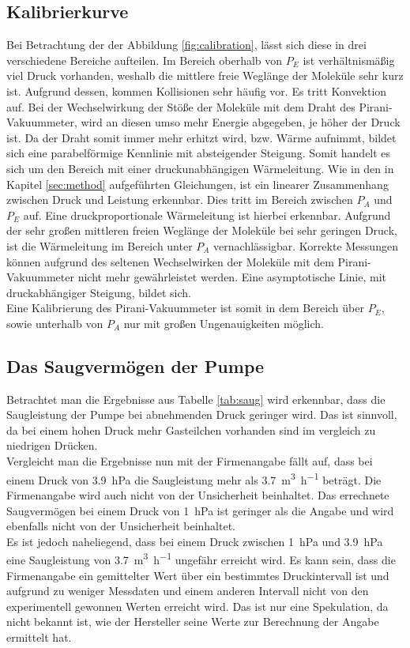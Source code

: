 \documentclass[a4paper,usenatbib]{aspdoc}
\begin{document}
        \subsection{Kalibrierkurve}
            Bei Betrachtung der der Abbildung \ref{fig:calibration}, lässt sich diese in drei verschiedene Bereiche aufteilen. Im Bereich oberhalb von $P_E$ ist verhältnismäßig viel Druck vorhanden, weshalb die mittlere freie Weglänge der Moleküle sehr kurz ist. Aufgrund dessen, kommen Kollisionen sehr häufig vor. Es tritt Konvektion auf. Bei der Wechselwirkung der Stöße der Moleküle mit dem Draht des Pirani-Vakuummeter, wird an diesen umso mehr Energie abgegeben, je höher der Druck ist. Da der Draht somit immer mehr erhitzt wird, bzw. Wärme aufnimmt, bildet sich eine parabelförmige Kennlinie mit absteigender Steigung. Somit handelt es sich um den Bereich mit einer druckunabhängigen Wärmeleitung.
            Wie in den in Kapitel \ref{sec:method} aufgeführten Gleichungen, ist ein linearer Zusammenhang zwischen Druck und Leistung erkennbar. Dies tritt im Bereich zwischen $P_A$ und $P_E$ auf. Eine druckproportionale Wärmeleitung ist hierbei erkennbar.
            Aufgrund der sehr großen mittleren freien Weglänge der Moleküle bei sehr geringen Druck, ist die Wärmeleitung im Bereich unter $P_A$ vernachlässigbar. Korrekte Messungen können aufgrund des seltenen Wechselwirken der Moleküle mit dem Pirani-Vakuummeter nicht mehr gewährleistet werden. Eine asymptotische Linie, mit druckabhängiger Steigung, bildet sich.
            \\
            Eine Kalibrierung des Pirani-Vakuummeter ist somit in dem Bereich über $P_E$, sowie unterhalb von $P_A$ nur mit großen Ungenauigkeiten möglich.
            
        \subsection{Das Saugvermögen der Pumpe}
            Betrachtet man die Ergebnisse aus Tabelle \ref{tab:saug} wird erkennbar, dass die Saugleistung der Pumpe bei abnehmenden Druck geringer wird. Das ist sinnvoll, da bei einem hohen Druck mehr Gasteilchen vorhanden sind im vergleich zu niedrigen Drücken.\\
            Vergleicht man die Ergebnisse nun mit der Firmenangabe fällt auf, dass bei einem Druck von \SI{3,9}{\hecto\pascal} die Saugleistung mehr als \SI[per-mode=fraction]{3,7}{\cubic\metre\per\hour} beträgt. Die Firmenangabe wird auch nicht von der Unsicherheit beinhaltet. Das errechnete Saugvermögen bei einem Druck von \SI{1}{\hecto\pascal} ist geringer als die Angabe und wird ebenfalls nicht von der Unsicherheit beinhaltet.\\
            Es ist jedoch naheliegend, dass bei einem Druck zwischen \SI{1}{\hecto\pascal} und \SI{3,9}{\hecto\pascal} eine Saugleistung von \SI[per-mode=fraction]{3,7}{\cubic\metre\per\hour} ungefähr erreicht wird. Es kann sein, dass die Firmenangabe ein gemittelter Wert über ein bestimmtes Druckintervall ist und aufgrund zu weniger Messdaten und einem anderen Intervall nicht von den experimentell gewonnen Werten erreicht wird. Das ist nur eine Spekulation, da nicht bekannt ist, wie der Hersteller seine Werte zur Berechnung der Angabe ermittelt hat. 
        
\end{document}
